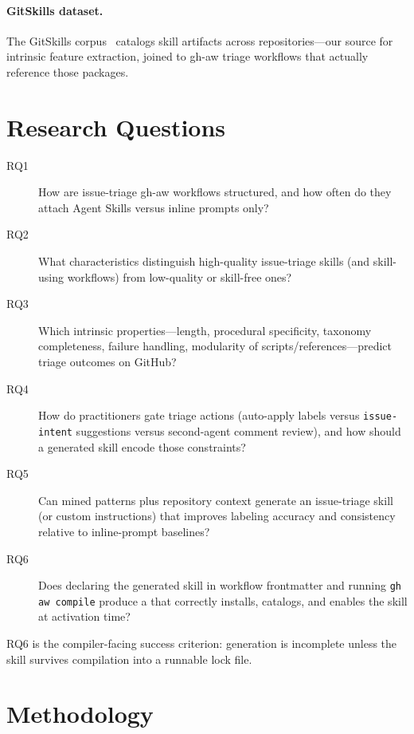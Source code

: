 \documentclass[sigconf,review,anonymous]{acmart}
\newcommand{\filepath}[1]{{\path{#1}}}
\begin{document}
\paragraph{GitSkills dataset.}
The GitSkills corpus~\cite{gitskills2026} catalogs skill artifacts across
repositories---our source for intrinsic feature extraction, joined to gh-aw
triage workflows that actually reference those packages.

\section{Research Questions}
\label{sec:rqs}

\begin{description}
  \item[RQ1] How are issue-triage gh-aw workflows structured, and how often do
        they attach Agent Skills versus inline prompts only?
  \item[RQ2] What characteristics distinguish high-quality issue-triage skills
        (and skill-using workflows) from low-quality or skill-free ones?
  \item[RQ3] Which intrinsic properties---length, procedural specificity, taxonomy
        completeness, failure handling, modularity of scripts/references---predict
        triage outcomes on GitHub?
  \item[RQ4] How do practitioners gate triage actions (auto-apply labels versus
        \texttt{issue-intent} suggestions versus second-agent comment review),
        and how should a generated skill encode those constraints?
  \item[RQ5] Can mined patterns plus repository context generate an issue-triage
        skill (or custom instructions) that improves labeling accuracy and
        consistency relative to inline-prompt baselines?
  \item[RQ6] Does declaring the generated skill in workflow frontmatter and running
        \texttt{gh aw compile} produce a \filepath{.lock.yml} that correctly
        installs, catalogs, and enables the skill at activation time?
\end{description}

RQ6 is the compiler-facing success criterion: generation is incomplete unless the
skill survives compilation into a runnable lock file.

\section{Methodology}
\label{sec:methodology}
\end{document}
